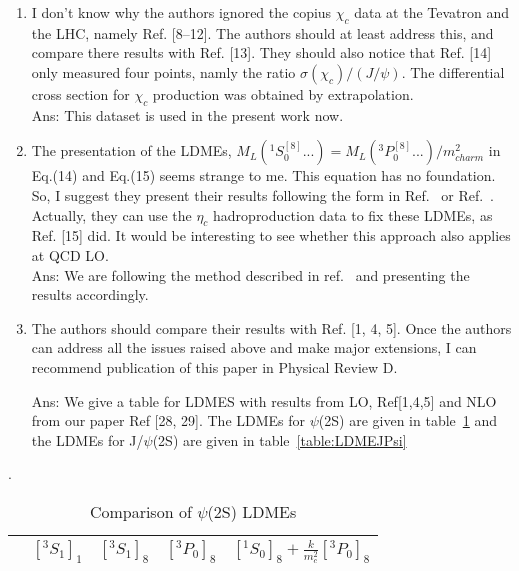 \documentclass[aps,prc,preprint,superscriptaddress,showpacs,showkeys,amsmath]{revtex4-1}
\begin{document}
\begin{enumerate}
\item I don’t know why the authors ignored the copius $\chi_c$ data at the Tevatron 
and the LHC, namely Ref. [8–12]. The authors should at least address this, and 
compare there results with Ref. [13]. They should also notice that Ref. [14] only 
measured four points, namly the ratio $\sigma(\chi_c)/(J/\psi)$. The differential 
cross section for $\chi_c$ production was obtained by extrapolation. \\
{\color{blue}
Ans: This dataset is used in the present work now.
}

\item The presentation of the LDMEs, $M_L(^1S^{[8]}_0 ...) = M_L(^3P^{[8]}_0 ...)/m^2_{charm}$
in Eq.(14) and Eq.(15) seems strange to me. This equation has no foundation. 
So, I suggest they present their results following the form in Ref.~\cite{Beneke:1996yw} 
or Ref.~\cite{Cho:1995vh}. 
Actually, they can use the $\eta_c$ hadroproduction data to fix these LDMEs, as 
Ref. [15] did. It would be interesting to see whether this approach also applies 
at QCD LO.\\

{\color{blue}
Ans: We are following the method described in ref.~\cite{Cho:1995vh,Beneke:1996yw} and
presenting the results accordingly.
}

\item The authors should compare their results with Ref. [1, 4, 5]. Once the authors 
can address all the issues raised above and make major extensions, I can recommend 
publication of this paper in Physical Review D.\\
{\color{blue}
Ans: We give a table for LDMES with results from LO, Ref[1,4,5] and 
NLO from our paper Ref [28, 29]. The LDMEs for $\psi$(2S) are given in 
table~\ref{table:LDMEPsi2S} and the LDMEs for J/$\psi$(2S) are given in 
table~\ref{table:LDMEJPsi}

}
\end{enumerate}



\begin{table}[h]
\caption{Comparison of $\psi$(2S) LDMEs}.
\begin{tabular}{ccccc}
\hline            
          &$[^3S_1]_{1}$  &$[^3S_1]_{8}$  &$[^3P_0]_{8}$   &$[^1S_{0}]_{8}+\frac{k}{m_{c}^2}[^3P_0]_{8}$\\
\hline
\end{tabular}
\label{table:LDMEPsi2S}
\end{table}
\end{document}
